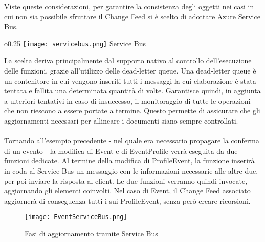 Viste queste considerazioni,
per garantire la consistenza degli oggetti 
nei casi in cui non sia possibile sfruttare il Change Feed
si è scelto di adottare Azure Service Bus.
\begin{wrapfigure}{o}{0.25\textwidth}
    \centering
    \texttt{[image: servicebus.png]}
    Service Bus
\end{wrapfigure}
La scelta deriva principalmente dal supporto nativo
al controllo dell'esecuzione delle funzioni,
grazie all'utilizzo delle dead-letter queue.
Una dead-letter queue è un contenitore in cui vengono inseriti
tutti i messaggi la cui elaborazione è stata tentata e fallita una determinata quantità di volte.
Garantisce quindi, in aggiunta a ulteriori tentativi in caso di insuccesso,
il monitoraggio di tutte le operazioni che non riescono a essere portate a termine.
Questo permette di assicurare che gli aggiornamenti necessari per allineare i documenti
siano sempre controllati.\\
\\
Tornando all'esempio precedente
- nel quale era necessario propagare la conferma di un evento -
la modifica di Event e di EventProfile verrà eseguita da due funzioni dedicate.
Al termine della modifica di ProfileEvent,
la funzione inserirà in coda al Service Bus un messaggio
con le informazioni necessarie alle altre due,
per poi inviare la risposta al client.
Le due funzioni verranno quindi invocate,
aggiornando gli elementi coinvolti.
Nel caso di Event, il Change Feed associato aggiornerà di conseguenza
tutti i sui ProfileEvent, senza però creare ricorsioni.\\

\begin{figure}[h!]
    \centering
    \texttt{[image: EventServiceBus.png]}
    \caption{Fasi di aggiornamento tramite Service Bus}
\end{figure}




\clearpage